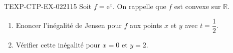 \begin{exercice}{TEXP-CTP-EX-022}{1}{15}
Soit $f = \mathrm{e}^x$. On rappelle que $f$ est convexe sur $\mathbb{R}$.
\begin{enumerate}
  \item Enoncer l'inégalité de Jensen pour $f$ aux points $x$ et $y$ avec $t = \dfrac{1}{2}$.
  \item Vérifier cette inégalité pour $x = 0$ et $y = 2$.
\end{enumerate}

\end{exercice}
